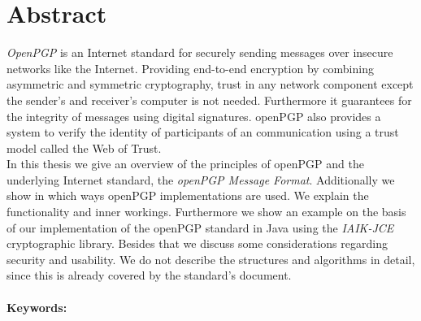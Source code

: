 

\chapter*{Abstract}
\label{cha:abstract}



\emph{OpenPGP} is an Internet standard for securely sending messages over insecure networks like the Internet. Providing end-to-end encryption by combining asymmetric and symmetric cryptography, trust in any network component except the sender's and receiver's computer is not needed. Furthermore it guarantees for the integrity of messages using digital signatures. openPGP also provides a system to verify the identity of participants of an communication using a trust model called the Web of Trust. \\


In this thesis we give an overview of the principles of openPGP and the underlying Internet standard, the\textit{ openPGP Message Format}. 
Additionally we show in which ways openPGP implementations are used.
We explain the functionality and inner workings. Furthermore we show an example on the basis of our implementation of the openPGP standard in Java using the \emph{IAIK-JCE} cryptographic library.
Besides that we discuss some considerations regarding security and usability. 
We do not describe the structures and algorithms in detail, since this is already covered by the standard's document. \\
\\



\textbf{Keywords:} \mykeywords

